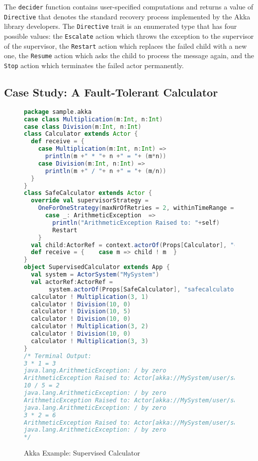 The {\tt decider} function contains user-specified computations and returns a 
value of {\tt Directive} that denotes the standard recovery process implemented 
by the Akka library developers.  The {\tt Directive} trait is an enumerated 
type that has four possible values: the
{\tt Escalate} action which throws the exception to the supervisor of the 
supervisor, the {\tt Restart} action which replaces the failed child with a new 
one, the {\tt Resume} action which asks the child to process the message again, 
and the {\tt Stop} action which terminates the failed actor permanently.


\begin{comment}
\subsubsection{System Configuration}
\subsubsection{Distributed and Cluster Programming}
\end{comment}


\subsection{Case Study: A Fault-Tolerant Calculator}



\begin{figure}[p]
  \begin{lstlisting}[language=scala]
package sample.akka
case class Multiplication(m:Int, n:Int)
case class Division(m:Int, n:Int)
class Calculator extends Actor {
  def receive = {
    case Multiplication(m:Int, n:Int) =>
      println(m +" * "+ n +" = "+ (m*n))
    case Division(m:Int, n:Int) =>
      println(m +" / "+ n +" = "+ (m/n))
  }
}
class SafeCalculator extends Actor {
  override val supervisorStrategy =
    OneForOneStrategy(maxNrOfRetries = 2, withinTimeRange = 1 minute) {
      case _: ArithmeticException  =>
        println("ArithmeticException Raised to: "+self)
        Restart
    }
  val child:ActorRef = context.actorOf(Props[Calculator], "child")
  def receive = {    case m => child ! m  }
}
object SupervisedCalculator extends App {
  val system = ActorSystem("MySystem")
  val actorRef:ActorRef = 
       system.actorOf(Props[SafeCalculator], "safecalculator")
  calculator ! Multiplication(3, 1)
  calculator ! Division(10, 0)
  calculator ! Division(10, 5)
  calculator ! Division(10, 0)
  calculator ! Multiplication(3, 2)
  calculator ! Division(10, 0)
  calculator ! Multiplication(3, 3)
}
/* Terminal Output:
3 * 1 = 3
java.lang.ArithmeticException: / by zero
ArithmeticException Raised to: Actor[akka://MySystem/user/safecalculator]
10 / 5 = 2
java.lang.ArithmeticException: / by zero
ArithmeticException Raised to: Actor[akka://MySystem/user/safecalculator]
java.lang.ArithmeticException: / by zero
3 * 2 = 6
ArithmeticException Raised to: Actor[akka://MySystem/user/safecalculator]
java.lang.ArithmeticException: / by zero
*/
    \end{lstlisting}
  \caption{Akka Example: Supervised Calculator}
  \label{akka_supervised_calculator}
\end{figure}


